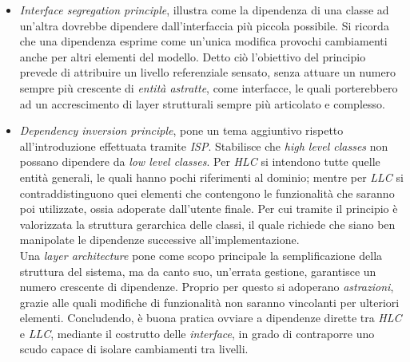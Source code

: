 \documentclass{article}
\begin{document}
\begin{itemize}[label={-}]
    \item \textit{Interface segregation principle}, illustra come la dipendenza di una classe ad un'altra dovrebbe dipendere dall'interfaccia più piccola possibile. Si ricorda che una dipendenza esprime come un'unica modifica provochi cambiamenti anche per altri elementi del modello. Detto ciò l'obiettivo del principio prevede di attribuire un livello referenziale sensato, senza attuare un numero sempre più crescente di \textit{entità astratte}, come interfacce, le quali porterebbero ad un accrescimento di layer strutturali sempre più articolato e complesso.
    \item \textit{Dependency inversion principle}, pone un tema aggiuntivo rispetto all'introduzione effettuata tramite \textit{ISP}. Stabilisce che \textit{high level classes} non possano dipendere da \textit{low level classes}. Per \textit{HLC} si intendono tutte quelle entità generali, le quali hanno pochi riferimenti al dominio; mentre per \textit{LLC} si contraddistinguono quei elementi che contengono le funzionalità che saranno poi utilizzate, ossia adoperate dall'utente finale. Per cui tramite il principio è valorizzata la struttura gerarchica delle classi, il quale richiede che siano ben manipolate le dipendenze successive all'implementazione.\vspace*{14pt}\\ Una \textit{layer architecture} pone come scopo principale la semplificazione della struttura del sistema, ma da canto suo, un'errata gestione, garantisce un numero crescente di dipendenze. Proprio per questo si adoperano \textit{astrazioni}, grazie alle quali modifiche di funzionalità non saranno vincolanti per ulteriori elementi. Concludendo, è buona pratica ovviare a dipendenze dirette tra \textit{HLC} e \textit{LLC}, mediante il costrutto delle \textit{interface}, in grado di contraporre uno scudo capace di isolare cambiamenti tra livelli. 
\end{itemize}
\vspace*{5pt}
\end{document}
